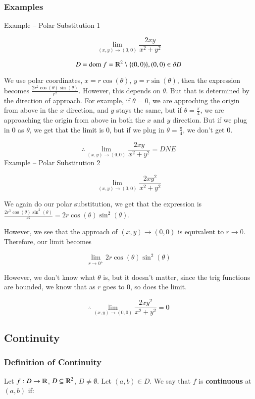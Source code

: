\documentclass [12 pt, twoside] {book}
\newcommand\+{\text{ }}
\begin{document}
\subsubsection{Examples}

Example -- Polar Substitution 1

$$\lim_{(x, y)\to(0, 0)} \frac{2xy}{x^2 + y^2}$$

$$D = \text{dom } f = \varmathbb{R}^2\setminus\{(0,0)\}, (0, 0)\in\partial D$$

We use polar coordinates, $x = r\cos(\theta)$, $y = r\sin(\theta)$, then the
expression becomes $\frac{2r^2\cos(\theta)\sin(\theta)}{r^2}$. However, this
depends on $\theta$. But that is determined by the direction of approach. For
example, if $\theta = 0$, we are approching the origin from above in the $x$
direction, and $y$ stays the same, but if $\theta = \frac{\pi}{4}$, we are
approaching the origin from above in both the $x$ and $y$ direction. But if we
plug in 0 as $\theta$, we get that the limit is $0$, but if we plug in
$\theta = \frac{\pi}{4}$, we don't get 0.

$$\therefore \lim_{(x, y)\to(0, 0)} \frac{2xy}{x^2 + y^2} = DNE$$
Example -- Polar Substitution 2

$$\lim_{(x, y)\to(0, 0)}\frac{2xy^2}{x^2 + y^2}$$

We again do our polar substitution, we get that the expression is $\frac{2r^3
\cos(\theta)\sin^2(\theta)}{r^2} = 2r\cos(\theta)\sin^2(\theta)$.

However, we see that the approach of $(x, y)\to(0, 0)$ is equivalent to $r \to
0$. Therefore, our limit becomes

$$\lim_{r\to0^+} 2r\cos(\theta)\sin^2(\theta)$$

However, we don't know what $\theta$ is, but it doesn't matter, since the trig
functions are bounded, we know that as $r$ goes to 0, so does the limit.

$$\therefore \lim_{(x, y)\to(0, 0)}\frac{2xy^2}{x^2 + y^2} = \boxed{0}$$

\subsection{Continuity}

\subsubsection{Definition of Continuity}
Let $f: D\to\varmathbb{R}$, $D\subseteq\varmathbb{R}^2$, $D\neq\emptyset$. Let
$(a, b)\in D$. We say that $f$ is \textbf{continuous} at $(a, b)$ if:
\end{document}
